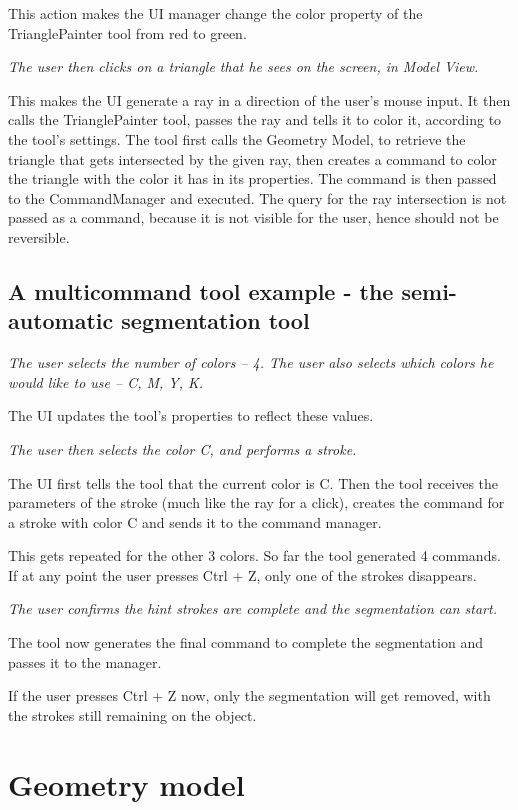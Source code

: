 This action makes the UI manager change the color property of the TrianglePainter tool from red to green.

\textit{The user then clicks on a triangle that he sees on the screen, in Model View.}

This makes the UI generate a ray in a direction of the user's mouse input. It then calls the TrianglePainter tool, passes the ray and tells it to color it, according to the tool's settings. The tool first calls the Geometry Model, to retrieve the triangle that gets intersected by the given ray, then creates a command to color the triangle with the color it has in its properties. The command is then passed to the CommandManager and executed. The query for the ray intersection is not passed as a command, because it is not visible for the user, hence should not be reversible.

\subsection{A multicommand tool example - the semi-automatic segmentation tool}
\textit{The user selects the number of colors -- 4. The user also selects which colors he would like to use -- C, M, Y, K.}

The UI updates the tool's properties to reflect these values.

\textit{The user then selects the color C, and performs a stroke.}

The UI first tells the tool that the current color is C. Then the tool receives the parameters of the stroke (much like the ray for a click), creates the command for a stroke with color C and sends it to the command manager.

This gets repeated for the other 3 colors. So far the tool generated 4 commands. If at any point the user presses Ctrl + Z, only one of the strokes disappears.

\textit{The user confirms the hint strokes are complete and the segmentation can start.}

The tool now generates the final command to complete the segmentation and passes it to the manager.


If the user presses Ctrl + Z now, only the segmentation will get removed, with the strokes still remaining on the object.

\section{Geometry model} \label{geometrymodel}

